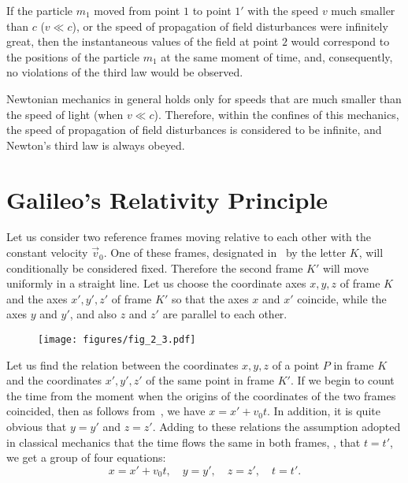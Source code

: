 If the particle $m_1$ moved from point $1$ to point $1'$ with the speed $v$ much smaller than $c$ ($v\ll c$), or the speed of propagation of field disturbances were infinitely great, then the instantaneous values of the field at point $2$ would correspond to the positions of the particle $m_1$ at the same moment of time, and, consequently, no violations of the third law would be observed.

Newtonian mechanics in general holds only for speeds that are much smaller than the speed of light (when $v\ll c$). Therefore, within the confines of this mechanics, the speed of propagation of field disturbances is considered to be infinite, and Newton's third law is always obeyed.

\section{Galileo's Relativity Principle}\label{sec:2_7}

Let us consider two reference frames moving relative to each other with the constant velocity $\vec{v}_0$. One of these frames, designated in~ by the letter $K$, will conditionally be considered fixed. Therefore the second frame $K'$ will move uniformly in a straight line. Let us choose the coordinate axes $x, y, z$ of frame $K$ and the axes $x',y',z'$ of frame $K'$ so that the axes $x$ and $x'$ coincide, while the axes $y$ and $y'$, and also $z$ and $z'$ are parallel to each other.

\begin{figure}[t]
	\begin{center}
		\texttt{[image: figures/fig\_2\_3.pdf]}
		\caption[]{}
		\label{fig:2_3}
	\end{center}
	\vspace{-0.7cm}
\end{figure}

Let us find the relation between the coordinates $x, y, z$ of a point $P$ in frame $K$ and the coordinates $x', y', z'$ of the same point in frame $K'$. If we begin to count the time from the moment when the origins of the coordinates of the two frames coincided, then as follows from~, we have $x=x'+v_0t$. In addition, it is quite obvious that $y=y'$ and $z=z'$. Adding to these relations the assumption adopted in classical mechanics that the time flows the same in both frames, \ie, that $t=t'$, we get a group of four equations:
\begin{equation}\label{eq:2_19}
x=x'+v_0t,\quad y=y',\quad z=z',\quad t=t'.
\end{equation}

